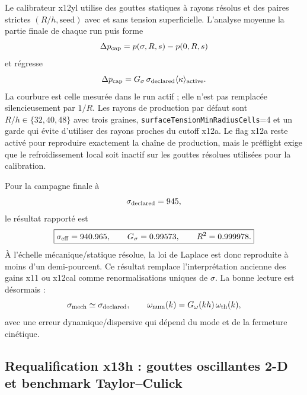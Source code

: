 \documentclass[11pt,a4paper]{article}
\begin{document}
Le calibrateur x12yl utilise des gouttes statiques à rayons résolus et des paires strictes $(R/h,\mathrm{seed})$ avec et sans tension superficielle. L'analyse moyenne la partie finale de chaque run puis forme
\begin{equation}
  \Delta p_{\rm cap}
  =
  p(\sigma,R,s)-p(0,R,s)
\end{equation}
et régresse
\begin{equation}
  \Delta p_{\rm cap}
  =
  G_\sigma\,\sigma_{\rm declared}
  \langle\kappa\rangle_{\rm active}.
  \label{eq:x12yl_mechanical}
\end{equation}
La courbure est celle mesurée dans le run actif ; elle n'est pas remplacée silencieusement par $1/R$. Les rayons de production par défaut sont $R/h\in\{32,40,48\}$ avec trois graines, \texttt{surfaceTensionMinRadiusCells}=4 et un garde qui évite d'utiliser des rayons proches du cutoff x12a. Le flag x12a reste activé pour reproduire exactement la chaîne de production, mais le préflight exige que le refroidissement local soit inactif sur les gouttes résolues utilisées pour la calibration.

Pour la campagne finale à
\[
  \sigma_{\rm declared}=945,
\]
le résultat rapporté est
\begin{equation}
  \boxed{
  \sigma_{\rm eff}=940.965,\qquad
  G_\sigma=0.99573,\qquad
  R^2=0.999978.
  }
  \label{eq:x12yl_final_gain}
\end{equation}
À l'échelle mécanique/statique résolue, la loi de Laplace est donc reproduite à moins d'un demi-pourcent. Ce résultat remplace l'interprétation ancienne des gains x11 ou x12cal comme renormalisations uniques de $\sigma$. La bonne lecture est désormais :
\begin{equation}
  \sigma_{\rm mech}
  \simeq \sigma_{\rm declared},
  \qquad
  \omega_{\rm num}(k)
  =G_\omega(kh)\,\omega_{\rm th}(k),
\end{equation}
avec une erreur dynamique/dispersive qui dépend du mode et de la fermeture cinétique.

\subsection{Requalification x13h : gouttes oscillantes 2-D et benchmark Taylor--Culick}
\label{sec:x13h_capillary_requalification}
\end{document}
